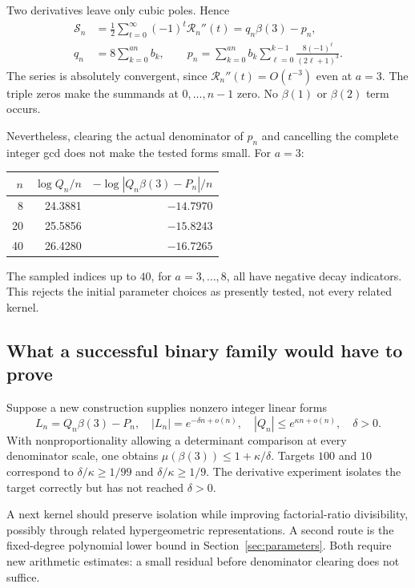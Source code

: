 Two derivatives leave only cubic poles. Hence
\begin{align*}
\mathcal S_n&=\frac12\sum_{t=0}^{\infty}(-1)^t\mathcal R_n''(t)
=q_n\beta(3)-p_n,\\
q_n&=8\sum_{k=0}^{an}b_k,\qquad
p_n=\sum_{k=0}^{an}b_k
\sum_{\ell=0}^{k-1}\frac{8(-1)^\ell}{(2\ell+1)^3}.
\end{align*}
The series is absolutely convergent, since
\(\mathcal R_n''(t)=O(t^{-3})\) even at \(a=3\).
The triple zeros make the summands at \(0,\ldots,n-1\) zero.
No \(\beta(1)\) or \(\beta(2)\) term occurs.

Nevertheless, clearing the actual denominator of \(p_n\) and
cancelling the complete integer gcd does not make the tested forms
small. For \(a=3\):
\begin{center}
\begin{tabular}{rrr}
\toprule
\(n\)&\(\log Q_n/n\)&\(-\log|Q_n\beta(3)-P_n|/n\)\\
\midrule
8&24.3881&\(-14.7970\)\\
20&25.5856&\(-15.8243\)\\
40&26.4280&\(-16.7265\)\\
\bottomrule
\end{tabular}
\end{center}
The sampled indices up to \(40\), for \(a=3,\ldots,8\), all have
negative decay indicators. This rejects the initial parameter
choices as presently tested, not every related kernel.

\subsection{What a successful binary family would have to prove}

Suppose a new construction supplies nonzero integer linear forms
\[
L_n=Q_n\beta(3)-P_n,\quad
|L_n|=e^{-\delta n+o(n)},\quad
|Q_n|\le e^{\kappa n+o(n)},\quad\delta>0.
\]
With nonproportionality allowing a determinant comparison at every
denominator scale, one obtains
\(\mu(\beta(3))\le1+\kappa/\delta\).
Targets \(100\) and \(10\) correspond to
\(\delta/\kappa\ge1/99\) and \(\delta/\kappa\ge1/9\).
The derivative experiment isolates the target correctly but has
not reached \(\delta>0\).

A next kernel should preserve isolation while improving
factorial-ratio divisibility, possibly through related
hypergeometric representations. A second route is the fixed-degree
polynomial lower bound in Section~\ref{sec:parameters}.
Both require new arithmetic estimates: a small residual before
denominator clearing does not suffice.

